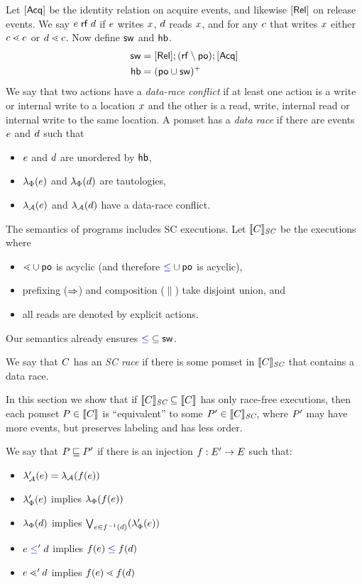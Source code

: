 Let $[\mathsf{Acq}]$ be the identity relation on acquire events, and likewise $[\mathsf{Rel}]$ on release events.
We say $e\mathrel{\mathsf{rf}}d$ if $e$ writes $x$, $d$ reads $x$, and for any $c$ that writes $x$ either $c\lessdot e$ or $d\lessdot c$.
Now define $\mathrel{\mathsf{sw}}$ and $\mathrel{\mathsf{hb}}$.
\begin{align*}
  {\ensuremath{\mathrel{\mathsf{sw}}}} &= [\mathsf{Rel}]; ({\mathrel{\mathsf{rf}}}\setminus{\ensuremath{\mathrel{\mathsf{po}}}}); [\mathsf{Acq}]
  \\
  {\mathrel{\mathsf{hb}}} &= ({\mathrel{\mathsf{po}}} \cup {\ensuremath{\mathrel{\mathsf{sw}}}})^+
\end{align*}
We say that two actions have a \emph{data-race conflict} if at least one
action is a write or internal write to a location $x$ and the other is a
read, write, internal read or internal write to the same location.  A pomset
has a \emph{data race} if there are events $e$ and $d$ such that
\begin{itemize}
\item $e$ and $d$ are unordered by $\mathrel{\mathsf{hb}}$,
\item $\lambda_{\Phi}(e)$ and $\lambda_{\Phi}(d)$ are tautologies,
\item $\lambda_{\mathcal{A}}(e)$ and $\lambda_{\mathcal{A}}(d)$ have a data-race conflict.
\end{itemize}

The semantics of programs includes SC executions.  Let $\llbracket C\rrbracket_{\textit{SC}}$ be the
executions where
\begin{itemize}
\item ${\lessdot}\cup{\ensuremath{\mathrel{\mathsf{po}}}}$ is acyclic (and therefore ${\mathrel{{\color{blue}\leq}}}\cup{\ensuremath{\mathrel{\mathsf{po}}}}$ is acyclic),
\item prefixing ($\mathbin\Rightarrow$) and composition ($\parallel$) take disjoint union, and
\item all reads are denoted by explicit actions.
\end{itemize}
Our semantics already ensures ${\mathrel{{\color{blue}\leq}}}\subseteq{\ensuremath{\mathrel{\mathsf{sw}}}}$.

We say that $C$ has an \emph{SC race} if there is some pomset in $\llbracket C\rrbracket_{\textit{SC}}$
that contains a data race.

In this section we show that if $\llbracket C\rrbracket_{\textit{SC}}\subseteq\llbracket C\rrbracket$ has only
race-free executions, then each pomset $P\in\llbracket C\rrbracket$ is ``equivalent''
to some $P'\in\llbracket C\rrbracket_{\textit{SC}}$, where $P'$ may have more events, but
preserves labeling and has less order.

We say that $P\sqsubseteq P'$ if there is an injection
$f:E'\rightarrow E$ such that:
\begin{itemize}
\item $\lambda_{\mathcal{A}}'(e) = \lambda_{\mathcal{A}}(f(e))$
\item $\lambda_{\Phi}'(e)$ implies $\lambda_{\Phi}(f(e))$
\item $\lambda_{\Phi}(d)$ implies $\bigvee_{e\in f^{-1}(d)}(\lambda_{\Phi}'(e))$
\item $e\mathrel{{\color{blue}\leq}}'d$ implies $f(e)\mathrel{{\color{blue}\leq}}f(d)$
\item $e\lessdot'd$ implies $f(e)\lessdot f(d)$
\end{itemize}

